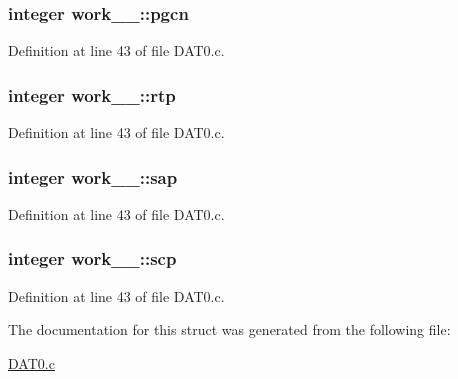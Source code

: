 \subsubsection[{\texorpdfstring{pgcn}{pgcn}}]{\setlength{\rightskip}{0pt plus 5cm}integer work\+\_\+\_\+\+::pgcn}\hypertarget{structwork__1___abd5ef67d66146361f4ebd85377cc544f}{}\label{structwork__1___abd5ef67d66146361f4ebd85377cc544f}


Definition at line 43 of file D\+A\+T0.\+c.

\subsubsection[{\texorpdfstring{rtp}{rtp}}]{\setlength{\rightskip}{0pt plus 5cm}integer work\+\_\+\_\+\+::rtp}\hypertarget{structwork__1___af3ee2620c7348918a217cdebfeec014c}{}\label{structwork__1___af3ee2620c7348918a217cdebfeec014c}


Definition at line 43 of file D\+A\+T0.\+c.

\subsubsection[{\texorpdfstring{sap}{sap}}]{\setlength{\rightskip}{0pt plus 5cm}integer work\+\_\+\_\+\+::sap}\hypertarget{structwork__1___a26b15e673285fe63908c6b07c16f75b0}{}\label{structwork__1___a26b15e673285fe63908c6b07c16f75b0}


Definition at line 43 of file D\+A\+T0.\+c.

\subsubsection[{\texorpdfstring{scp}{scp}}]{\setlength{\rightskip}{0pt plus 5cm}integer work\+\_\+\_\+\+::scp}\hypertarget{structwork__1___aba97b44bdb374730ebef3132abeddfbd}{}\label{structwork__1___aba97b44bdb374730ebef3132abeddfbd}


Definition at line 43 of file D\+A\+T0.\+c.



The documentation for this struct was generated from the following file\+:\begin{DoxyCompactItemize}
\item 
\hyperlink{DAT0_8c}{D\+A\+T0.\+c}\end{DoxyCompactItemize}
